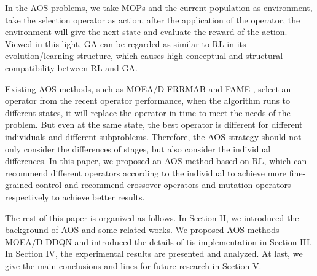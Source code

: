 \documentclass[journal]{IEEEtran}
\begin{document}
In the AOS problems, we take MOPs and the current population as environment, take the selection operator as action, after the application of the operator, the environment will give the next state and evaluate the reward of the action.
Viewed in this light, GA can be regarded as similar to RL in its evolution/learning structure, which causes high conceptual and structural compatibility between RL and GA.

Existing AOS methods, such as MOEA/D-FRRMAB \cite{frrmab} and FAME \cite{fame}, select an operator from the recent operator performance, when the algorithm runs to different states, it will replace the operator in time to meet the needs of the problem.
But even at the same state, the best operator is different for different individuals and different subproblems. Therefore, the AOS strategy should not only consider the differences of stages, but also consider the individual differences.
In this paper, we proposed an AOS method based on RL, which can recommend different operators according to the individual to achieve more fine-grained control and recommend crossover operators and mutation operators respectively to achieve better results.

The rest of this paper is organized as follows. In Section II, we introduced the background of AOS and some related works. We proposed AOS methods MOEA/D-DDQN and introduced the details of tis implementation in Section III. In Section IV, the experimental results are presented and analyzed. At last, we give the main conclusions and lines for future research in Section V.
\end{document}
